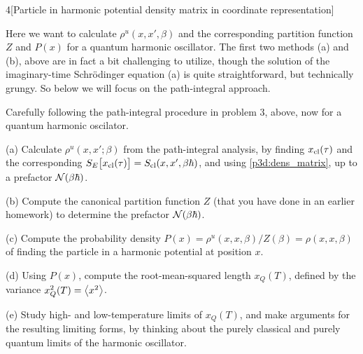 \documentclass[12pt]{article}
\begin{document}
\newpage
\begin{problem}{4}[Particle in harmonic potential density matrix in coordinate
    representation]

Here we want to calculate $\rho^u(x,x',\beta)$ and the corresponding partition
function $Z$ and $P(x)$ for a quantum harmonic oscillator. The first two methods
(a) and (b), above are in fact a bit challenging to utilize, though the solution
of the imaginary-time Schr\"{o}dinger equation (a) is quite straightforward, but
technically grungy. So below we will focus on the path-integral approach.

Carefully following the path-integral procedure in problem 3, above, now for a
quantum harmonic oscilator.

(a) Calculate $\rho^u(x,x';\beta)$ from the path-integral analysis, by finding
$x_{\text{cl}}(\tau)$ and the corresponding
$S_E\qty[x_{\text{cl}}(\tau)]=S_{\text{cl}}(x,x',\beta\hbar)$, and using
\eqref{p3d:dens_matrix}, up to a prefactor $\mathcal{N}(\beta\hbar)$.
\begin{solution}
\end{solution}

(b) Compute the canonical partition function $Z$ (that you have done in an
earlier homework) to determine the prefactor $\mathcal{N}(\beta\hbar)$.
\begin{solution}
    
\end{solution}

(c) Compute the probability density
$P(x)=\rho^u(x,x,\beta)/Z(\beta)=\rho(x,x,\beta)$ of finding the particle in a
harmonic potential at position $x$.
\begin{solution}
    
\end{solution}

(d) Using $P(x)$, compute the root-mean-squared length $x_Q(T)$, defined by the
variance $x_Q^2(T)=\expval{x^2}$.
\begin{solution}
    
\end{solution}

(e) Study high- and low-temperature limits of $x_Q(T)$, and make arguments for
the resulting limiting forms, by thinking about the purely classical and purely
quantum limits of the harmonic oscillator.
\end{problem}
\newpage
\end{document}
